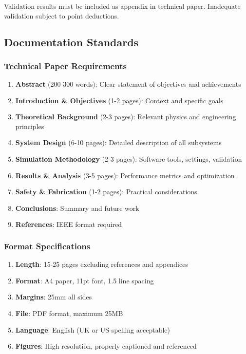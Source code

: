\subsubsection{}
Validation results must be included as appendix in technical paper. Inadequate validation subject to point deductions.

\subsection{Documentation Standards}

\subsubsection{Technical Paper Requirements}
\begin{enumerate}[noitemsep]
    \item \textbf{Abstract} (200-300 words): Clear statement of objectives and achievements
    \item \textbf{Introduction \& Objectives} (1-2 pages): Context and specific goals
    \item \textbf{Theoretical Background} (2-3 pages): Relevant physics and engineering principles
    \item \textbf{System Design} (6-10 pages): Detailed description of all subsystems
    \item \textbf{Simulation Methodology} (2-3 pages): Software tools, settings, validation
    \item \textbf{Results \& Analysis} (3-5 pages): Performance metrics and optimization
    \item \textbf{Safety \& Fabrication} (1-2 pages): Practical considerations
    \item \textbf{Conclusions}: Summary and future work
    \item \textbf{References}: IEEE format required
\end{enumerate}

\subsubsection{Format Specifications}
\begin{enumerate}[noitemsep]
    \item \textbf{Length}: 15-25 pages excluding references and appendices
    \item \textbf{Format}: A4 paper, 11pt font, 1.5 line spacing
    \item \textbf{Margins}: 25mm all sides
    \item \textbf{File}: PDF format, maximum 25MB
    \item \textbf{Language}: English (UK or US spelling acceptable)
    \item \textbf{Figures}: High resolution, properly captioned and referenced
\end{enumerate}


